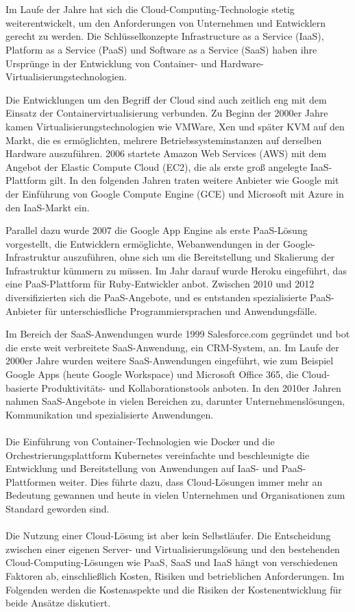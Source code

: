 \\\\
Im Laufe der Jahre hat sich die Cloud-Computing-Technologie stetig weiterentwickelt, um den Anforderungen von Unternehmen und Entwicklern gerecht zu werden. Die Schlüsselkonzepte Infrastructure as a Service (IaaS), Platform as a Service (PaaS) und Software as a Service (SaaS) haben ihre Ursprünge in der Entwicklung von Container- und Hardware-Virtualisierungstechnologien.

Die Entwicklungen um den Begriff der Cloud sind auch zeitlich eng mit dem Einsatz der Containervirtualisierung verbunden. Zu Beginn der 2000er Jahre kamen Virtualisierungstechnologien wie VMWare, Xen und später KVM auf den Markt, die es ermöglichten, mehrere Betriebssysteminstanzen auf derselben Hardware auszuführen. 2006 startete Amazon Web Services (AWS) mit dem Angebot der Elastic Compute Cloud (EC2), die als erste groß angelegte IaaS-Plattform gilt. In den folgenden Jahren traten weitere Anbieter wie Google mit der Einführung von Google Compute Engine (GCE) und Microsoft mit Azure in den IaaS-Markt ein.

Parallel dazu wurde 2007 die Google App Engine als erste PaaS-Lösung vorgestellt, die Entwicklern ermöglichte, Webanwendungen in der Google-Infrastruktur auszuführen, ohne sich um die Bereitstellung und Skalierung der Infrastruktur kümmern zu müssen. Im Jahr darauf wurde Heroku eingeführt, das eine PaaS-Plattform für Ruby-Entwickler anbot. Zwischen 2010 und 2012 diversifizierten sich die PaaS-Angebote, und es entstanden spezialisierte PaaS-Anbieter für unterschiedliche Programmiersprachen und Anwendungsfälle.

Im Bereich der SaaS-Anwendungen wurde 1999 Salesforce.com gegründet und bot die erste weit verbreitete SaaS-Anwendung, ein CRM-System, an. Im Laufe der 2000er Jahre wurden weitere SaaS-Anwendungen eingeführt, wie zum Beispiel Google Apps (heute Google Workspace) und Microsoft Office 365, die Cloud-basierte Produktivitäts- und Kollaborationstools anboten. In den 2010er Jahren nahmen SaaS-Angebote in vielen Bereichen zu, darunter Unternehmenslösungen, Kommunikation und spezialisierte Anwendungen.
\\\\
Die Einführung von Container-Technologien wie Docker und die Orchestrierungsplattform Kubernetes  vereinfachte und beschleunigte die Entwicklung und Bereitstellung von Anwendungen auf IaaS- und PaaS-Plattformen weiter. Dies führte dazu, dass Cloud-Lösungen immer mehr an Bedeutung gewannen und heute in vielen Unternehmen und Organisationen zum Standard geworden sind.
\\\\
Die Nutzung einer Cloud-Lösung ist aber kein Selbstläufer. Die Entscheidung zwischen einer eigenen Server- und Virtualisierungslösung und den bestehenden Cloud-Computing-Lösungen wie PaaS, SaaS und IaaS hängt von verschiedenen Faktoren ab, einschließlich Kosten, Risiken und betrieblichen Anforderungen. Im Folgenden werden die Kostenaspekte und die Risiken der Kostenentwicklung für beide Ansätze diskutiert.

